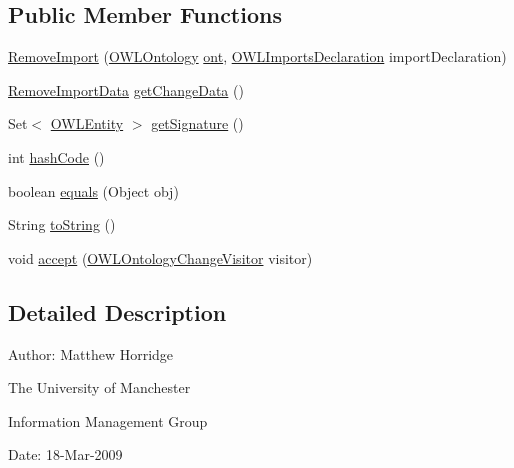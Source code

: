\subsection*{Public Member Functions}
\begin{DoxyCompactItemize}
\item 
\hyperlink{classorg_1_1semanticweb_1_1owlapi_1_1model_1_1_remove_import_a4c9910277af16fa4f597592c1758f21e}{Remove\-Import} (\hyperlink{interfaceorg_1_1semanticweb_1_1owlapi_1_1model_1_1_o_w_l_ontology}{O\-W\-L\-Ontology} \hyperlink{classorg_1_1semanticweb_1_1owlapi_1_1model_1_1_o_w_l_ontology_change_a9b8b64f1cab33aae500db20e19186211}{ont}, \hyperlink{interfaceorg_1_1semanticweb_1_1owlapi_1_1model_1_1_o_w_l_imports_declaration}{O\-W\-L\-Imports\-Declaration} import\-Declaration)
\item 
\hyperlink{classorg_1_1semanticweb_1_1owlapi_1_1change_1_1_remove_import_data}{Remove\-Import\-Data} \hyperlink{classorg_1_1semanticweb_1_1owlapi_1_1model_1_1_remove_import_a16bd427ef74a67f95a86b1924857837d}{get\-Change\-Data} ()
\item 
Set$<$ \hyperlink{interfaceorg_1_1semanticweb_1_1owlapi_1_1model_1_1_o_w_l_entity}{O\-W\-L\-Entity} $>$ \hyperlink{classorg_1_1semanticweb_1_1owlapi_1_1model_1_1_remove_import_a7a71063e47bb54345868c0275bbfbe93}{get\-Signature} ()
\item 
int \hyperlink{classorg_1_1semanticweb_1_1owlapi_1_1model_1_1_remove_import_ab6ec58626f5a4ee14bb7b69e07d39fdb}{hash\-Code} ()
\item 
boolean \hyperlink{classorg_1_1semanticweb_1_1owlapi_1_1model_1_1_remove_import_a9a9c41fc38aecd875a7554a7f8b8a1b5}{equals} (Object obj)
\item 
String \hyperlink{classorg_1_1semanticweb_1_1owlapi_1_1model_1_1_remove_import_af0110431d64e586b4994d15053b5fffe}{to\-String} ()
\item 
void \hyperlink{classorg_1_1semanticweb_1_1owlapi_1_1model_1_1_remove_import_a68b7baa9a320f708e0fb12ce453a6bfe}{accept} (\hyperlink{interfaceorg_1_1semanticweb_1_1owlapi_1_1model_1_1_o_w_l_ontology_change_visitor}{O\-W\-L\-Ontology\-Change\-Visitor} visitor)
\end{DoxyCompactItemize}


\subsection{Detailed Description}
Author\-: Matthew Horridge\par
 The University of Manchester\par
 Information Management Group\par
 Date\-: 18-\/\-Mar-\/2009 

